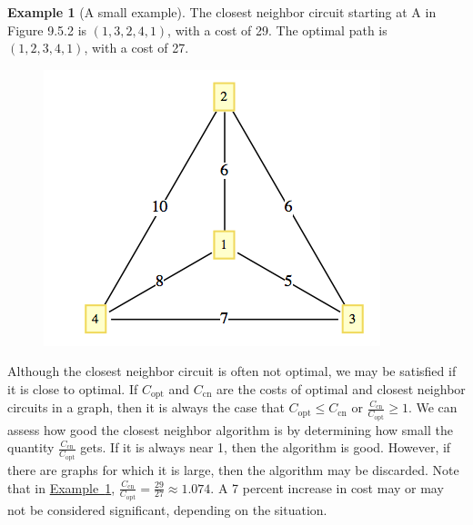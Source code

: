 \documentclass[10pt,]{book}
\theoremstyle{plain}
\theoremstyle{definition}
\theoremstyle{definition}
\theoremstyle{definition}
\newtheorem{example}[theorem]{Example}
\theoremstyle{definition}
\theoremstyle{definition}
\numberwithin{equation}{section}
\begin{document}
\begin{example}[A small example]\label{ex-tsp-small-example}
 The closest neighbor circuit starting at A in Figure 9.5.2 is \((1,3,2,4,1)\), with a cost of 29. The optimal path is \((1,2,3,4,1)\),
with a cost of 27.%
\leavevmode%
\begin{figure}
\centering
\includegraphics[width=1\linewidth]{images/fig-small-tsp-example.png}
\end{figure}
\end{example}
\par
Although the closest neighbor circuit is often not optimal, we may be satisfied if it is close to optimal. If \(C_{\text{opt}}\) and \(C_{\text{cn}}\)
are the costs of optimal and closest neighbor circuits in a graph, then it is always the case that \(C_{\text{opt}}\leq C_{\text{cn}}\) or \(\frac{C_{\text{cn}}}{C_{\text{opt}}}\geq
1\). We can assess how good the closest neighbor algorithm is by determining how small the quantity \(\frac{C_{\text{cn}}}{C_{\text{opt}}}\) gets.
If it is always near 1, then the algorithm is good. However, if there are graphs for which it is large, then the algorithm may be discarded. Note
that in \hyperref[ex-tsp-small-example]{Example~\ref{ex-tsp-small-example}}, \(\frac{C_{\text{cn}}}{C_{\text{opt}}} = \frac{29}{27}\approx 1.074\). A 7 percent increase in cost may or may not be considered
significant, depending on the situation.%
\end{document}
